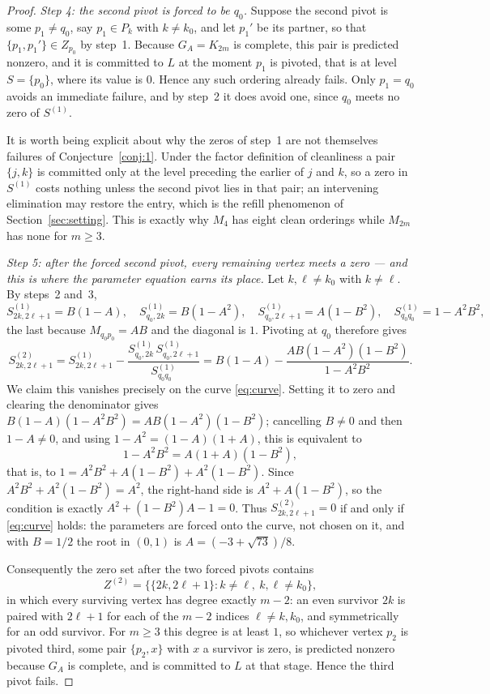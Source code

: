 \documentclass[11pt]{article}
\theoremstyle{plain}
\theoremstyle{definition}
\theoremstyle{remark}
\begin{document}
\begin{aiblock}
\begin{proof}
\emph{Step 4: the second pivot is forced to be $q_0$.} Suppose the second pivot is some
$p_1\neq q_0$, say $p_1\in P_k$ with $k\neq k_0$, and let $p_1'$ be its partner, so that
$\{p_1,p_1'\}\in Z_{p_0}$ by step~1. Because $G_A=K_{2m}$ is complete, this pair is predicted nonzero,
and it is committed to $L$ at the moment $p_1$ is pivoted, that is at level $S=\{p_0\}$, where its
value is $0$. Hence any such ordering already fails. Only $p_1=q_0$ avoids an immediate failure, and
by step~2 it does avoid one, since $q_0$ meets no zero of $S^{(1)}$.

It is worth being explicit about why the zeros of step~1 are not themselves failures of
Conjecture~\ref{conj:1}. Under the factor definition of cleanliness a pair $\{j,k\}$ is committed only
at the level preceding the earlier of $j$ and $k$, so a zero in $S^{(1)}$ costs nothing unless the
second pivot lies in that pair; an intervening elimination may restore the entry, which is the refill
phenomenon of Section~\ref{sec:setting}. This is exactly why $M_4$ has eight clean orderings while
$M_{2m}$ has none for $m\ge3$.

\emph{Step 5: after the forced second pivot, every remaining vertex meets a zero --- and this is
where the parameter equation earns its place.} Let $k,\ell\neq k_0$ with $k\neq\ell$. By steps~2
and~3,
\[
S^{(1)}_{2k,2\ell+1}=B(1-A),\quad
S^{(1)}_{q_0,2k}=B(1-A^2),\quad
S^{(1)}_{q_0,2\ell+1}=A(1-B^2),\quad
S^{(1)}_{q_0q_0}=1-A^2B^2 ,
\]
the last because $M_{q_0p_0}=AB$ and the diagonal is $1$. Pivoting at $q_0$ therefore gives
\[
S^{(2)}_{2k,2\ell+1}
 =S^{(1)}_{2k,2\ell+1}-\frac{S^{(1)}_{q_0,2k}\,S^{(1)}_{q_0,2\ell+1}}{S^{(1)}_{q_0q_0}}
 =B(1-A)-\frac{AB(1-A^2)(1-B^2)}{1-A^2B^2}.
\]
We claim this vanishes precisely on the curve \eqref{eq:curve}. Setting it to zero and clearing the
denominator gives $B(1-A)(1-A^2B^2)=AB(1-A^2)(1-B^2)$; cancelling $B\neq0$ and then $1-A\neq0$, and
using $1-A^2=(1-A)(1+A)$, this is equivalent to
\[
1-A^2B^2=A(1+A)(1-B^2),
\]
that is, to $1=A^2B^2+A(1-B^2)+A^2(1-B^2)$. Since $A^2B^2+A^2(1-B^2)=A^2$, the right-hand side is
$A^2+A(1-B^2)$, so the condition is exactly $A^2+(1-B^2)A-1=0$. Thus $S^{(2)}_{2k,2\ell+1}=0$ if and
only if \eqref{eq:curve} holds: the parameters are forced onto the curve, not chosen on it, and with
$B=1/2$ the root in $(0,1)$ is $A=(-3+\sqrt{73})/8$.

Consequently the zero set after the two forced pivots contains
\[
Z^{(2)}=\bigl\{\{2k,2\ell+1\}: k\neq\ell,\ k,\ell\neq k_0\bigr\},
\]
in which every surviving vertex has degree exactly $m-2$: an even survivor $2k$ is paired with
$2\ell+1$ for each of the $m-2$ indices $\ell\neq k,k_0$, and symmetrically for an odd survivor. For
$m\ge3$ this degree is at least $1$, so whichever vertex $p_2$ is pivoted third, some pair
$\{p_2,x\}$ with $x$ a survivor is zero, is predicted nonzero because $G_A$ is complete, and is
committed to $L$ at that stage. Hence the third pivot fails.


\end{proof}
\end{aiblock}
\end{document}

